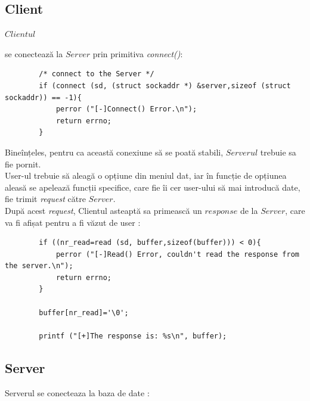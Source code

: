\documentclass[runningheads]{llncs}
\begin{document}
	\subsection{Client}
	\hypertarget{sec:detailsConnect}{$Clientul$} se conectează la $Server$ prin primitiva \textit{connect()}:
	\begin{verbatim}
		/* connect to the Server */
		if (connect (sd, (struct sockaddr *) &server,sizeof (struct sockaddr)) == -1){
			perror ("[-]Connect() Error.\n");
			return errno;
		}
	\end{verbatim}
	Bineînțeles, pentru ca această conexiune să se poată stabili, $Serverul$ trebuie sa fie pornit.\\
	User-ul trebuie să aleagă o opțiune din meniul dat, iar în funcție de opțiunea aleasă se apelează funcții specifice, care fie îi cer user-ului să mai introducă date, fie trimit \textit{request} către $Server$.\\
	După acest \textit{request}, Clientul asteaptă sa primească un $response$ de la $Server$, care va fi afișat pentru a fi văzut de user :
	\begin{verbatim}
		if ((nr_read=read (sd, buffer,sizeof(buffer))) < 0){
			perror ("[-]Read() Error, couldn't read the response from the server.\n");
			return errno;
		}	
		
		buffer[nr_read]='\0';	
		
		printf ("[+]The response is: %s\n", buffer);
	\end{verbatim}
	
	\subsection{Server}
	Serverul se conecteaza la baza de date : 
	
\end{document}
